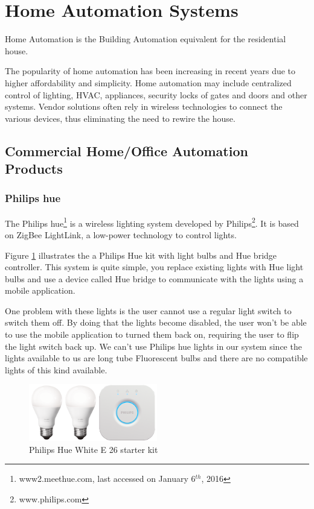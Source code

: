 \section{Home Automation Systems} \label{ssec:num1}

Home Automation is the Building Automation equivalent for the residential house.

The popularity of home automation has been increasing in recent years due to higher affordability and simplicity. Home automation  may include centralized control of lighting, \ac{HVAC}, appliances, security locks of gates and doors and other systems.
Vendor solutions often rely in wireless technologies to connect the various devices, thus eliminating the need to rewire the house.

\subsection{Commercial Home/Office Automation Products}



\subsubsection{Philips hue}



The Philips hue\footnote{www2.meethue.com, last accessed on January 6$^{th}$, 2016} is a wireless lighting system developed by Philips\footnote{www.philips.com}. It is based on ZigBee LightLink\cite{zigbee:ZLL}, a low-power technology to control lights.

Figure \ref{fig:zll} illustrates the a Philips Hue kit with light bulbs and Hue bridge controller. This system is quite simple, you replace existing lights with Hue light bulbs and use a device called Hue bridge to communicate with the lights using a mobile application. 

One problem with these lights is the user cannot use a regular light switch to switch them off. By doing that the lights become disabled, the user won't be able to use the mobile application to turned them back on, requiring the user to flip the light switch back up. We can't use Philips hue lights in our system since the lights available to us are long tube  Fluorescent bulbs and there are no compatible lights of this kind available.


\begin{figure}[h]
\centering
\includegraphics[width=0.5\textwidth]{Figures/hue-white-starter-kit-image}
\caption{Philips Hue White E 26 starter kit}
\label{fig:zll}
\end{figure}

